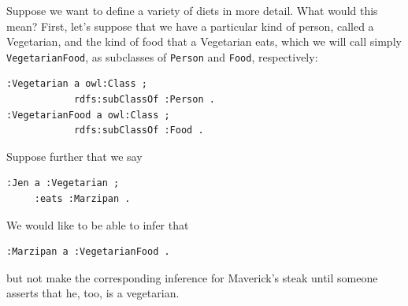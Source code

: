 Suppose we want to define a variety of diets in more detail. What would
this mean? First, let's suppose that we have a particular kind of
person, called a Vegetarian, and the kind of food that a Vegetarian
eats, which we will call simply \texttt{VegetarianFood}, as subclasses of \texttt{Person}
and \texttt{Food}, respectively:

\begin{lstlisting}
:Vegetarian a owl:Class ;
            rdfs:subClassOf :Person .
:VegetarianFood a owl:Class ;
            rdfs:subClassOf :Food .
\end{lstlisting}

Suppose further that we say

\begin{lstlisting}
:Jen a :Vegetarian ;
     :eats :Marzipan .
\end{lstlisting}

We would like to be able to infer that

\begin{lstlisting}
:Marzipan a :VegetarianFood .
\end{lstlisting}

but not make the corresponding inference for Maverick's steak until
someone asserts that he, too, is a vegetarian.

